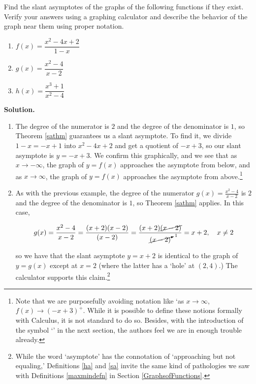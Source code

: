 \begin{ex} \label{saexample} Find the slant asymptotes of the graphs of the following functions if they exist.  Verify your answers using a graphing calculator and describe the behavior of the graph near them using proper notation.

\begin{multicols}{3}

\begin{enumerate}

\item  $f(x) = \dfrac{x^2-4x+2}{1-x}$  

\item  \label{sacancel} $g(x) = \dfrac{x^2-4}{x-2}$

\item  $h(x) = \dfrac{x^3+1}{x^2-4}$

\end{enumerate}

\end{multicols}


{\bf Solution.}

\begin{enumerate}

\item  The degree of the numerator is $2$ and the degree of the denominator is $1$, so Theorem \ref{sathm} guarantees us a slant asymptote.  To find it, we divide $1-x = -x+1$ into $x^2-4x+2$ and get a quotient of $-x+3$, so our slant asymptote is $y=-x+3$.  We confirm this graphically, and we see that as $x \rightarrow -\infty$, the graph of $y=f(x)$ approaches the asymptote from below, and as $x \rightarrow \infty$, the graph of $y=f(x)$ approaches the asymptote from above.\footnote{Note that we are purposefully avoiding notation like `as $x\rightarrow \infty$, $f(x) \rightarrow (-x+3)^{+}$.  While it is possible to define these notions formally with Calculus, it is not standard to do so.  Besides, with the introduction of the symbol `\textinterrobang' in the next section, the authors feel we are in enough trouble already.}

\item  As with the previous example, the degree of the numerator $g(x) = \frac{x^2-4}{x-2}$ is $2$ and the degree of the denominator is $1$, so Theorem \ref{sathm} applies.  In this case, 

\[ g(x) = \frac{x^2-4}{x-2} = \frac{(x+2)(x-2)}{(x-2)} = \frac{(x+2) \cancel{(x-2)}}{\cancelto{1}{(x-2)}} = x+2, \quad x \neq 2\]

so we have that the slant asymptote $y=x+2$ is identical to the graph of $y=g(x)$ except at $x=2$ (where the latter has a `hole' at $(2,4)$.)  The calculator supports this claim.\footnote{While the word `asymptote' has the connotation of `approaching but not equaling,' Definitions \ref{ha} and \ref{sa} invite the same kind of pathologies we saw with Definitions \ref{maxmindefn} in Section \ref{GraphsofFunctions}.}


\end{enumerate}
\end{ex}
